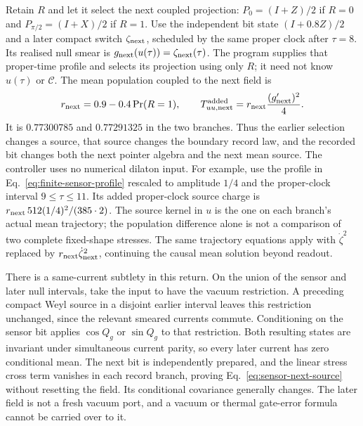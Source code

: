 Retain $R$ and let it select the next coupled projection:
$P_0=(I+Z)/2$ if $R=0$ and $P_{\pi/2}=(I+X)/2$ if $R=1$.
Use the independent bit state $(I+0.8Z)/2$ and a later compact switch
$\zeta_{\rm next}$, scheduled by the same proper clock after $\tau=8$.
Its realised null smear is $g_{\rm next}(u(\tau))=\zeta_{\rm next}(\tau)$.
The program supplies that proper-time profile and selects its projection using
only $R$; it need not know $u(\tau)$ or $\mathcal C$.
The mean population coupled to the next field is
\begin{equation}\label{eq:sensor-next-source}
 r_{\rm next}=0.9-0.4\Pr(R=1),\qquad
 T_{uu,\rm next}^{\rm added}
       =r_{\rm next}\frac{(g_{\rm next}')^2}{4}.
\end{equation}
It is $0.77300785$ and $0.77291325$ in the two branches. Thus the earlier
selection changes a source, that source changes the boundary record law, and
the recorded bit changes both the next pointer algebra and the next mean source.
The controller uses no numerical dilaton input.
For example, use the profile in Eq.~\eqref{eq:finite-sensor-profile} rescaled
to amplitude $1/4$ and the proper-clock interval $9\le\tau\le11$.
Its added proper-clock source charge is
$r_{\rm next}\,512(1/4)^2/(385\cdot2)$. The source kernel in $u$ is the one
on each branch's actual mean trajectory; the population difference alone is
not a comparison of two complete fixed-shape stresses. The same trajectory
equations apply with $\dot\zeta^2$ replaced by
$r_{\rm next}\dot\zeta_{\rm next}^2$, continuing the causal mean solution
beyond readout.

There is a same-current subtlety in this return. On the union of the sensor and
later null intervals, take the input to have the vacuum restriction. A preceding
compact Weyl source in a disjoint earlier interval leaves this restriction
unchanged, since the relevant smeared currents commute. Conditioning on the
sensor bit applies $\cos Q_g$ or $\sin Q_g$ to that restriction. Both resulting
states are invariant under simultaneous current parity, so every later current
has zero conditional mean. The next bit is independently prepared, and the
linear stress cross term vanishes in each record branch, proving
Eq.~\eqref{eq:sensor-next-source} without resetting the field. Its conditional
covariance generally changes. The later field is not a fresh vacuum port, and
a vacuum or thermal gate-error formula cannot be carried over to it.

